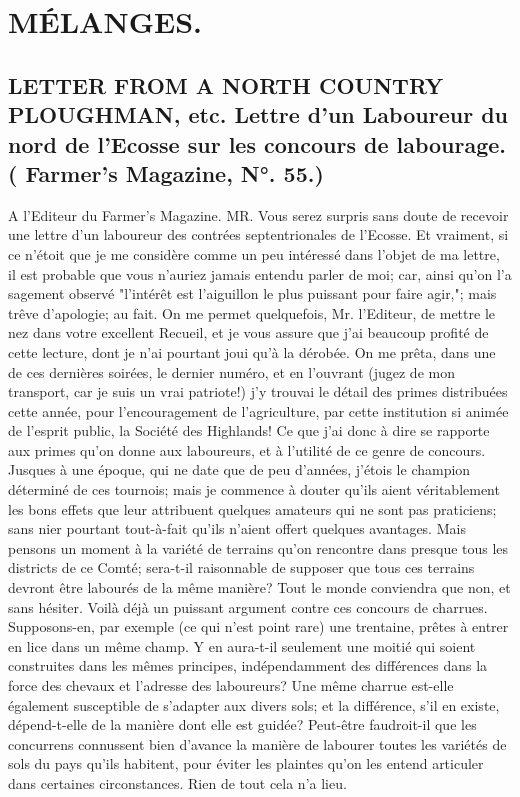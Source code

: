 \setcounter{page}{140}
\chapter{MÉLANGES.}
\section{LETTER FROM A NORTH COUNTRY PLOUGHMAN, etc. Lettre d'un Laboureur du nord de l'Ecosse sur les concours de labourage. ( Farmer's Magazine, N°. 55.)}
A l'Editeur du Farmer's Magazine.
MR.
Vous serez surpris sans doute de recevoir une lettre d'un laboureur des contrées septentrionales de l'Ecosse. Et vraiment, si ce n'étoit que je me considère comme un peu intéressé dans l'objet de ma lettre, il est probable que vous n'auriez jamais entendu parler de moi; car, ainsi qu'on l'a sagement observé "l'intérêt est l'aiguillon le plus puissant pour faire agir,"; mais trêve d'apologie; au fait.
On me permet quelquefois, Mr. l'Editeur, de mettre le nez dans votre excellent Recueil, et je vous assure que j'ai beaucoup profité de cette lecture, dont je n'ai pourtant joui qu'à la dérobée. On me prêta, dans une de ces dernières soirées, le dernier numéro, et en l'ouvrant (jugez de mon transport, car je suis un vrai patriote!) j'y trouvai\setcounter{page}{141} le détail des primes distribuées cette année, pour l'encouragement de l'agriculture, par cette institution si animée de l'esprit public, la Société des Highlands! Ce que j'ai donc à dire se rapporte aux primes qu'on donne aux laboureurs, et à l'utilité de ce genre de concours.
Jusques à une époque, qui ne date que de peu d'années, j'étois le champion déterminé de ces tournois; mais je commence à douter qu'ils aient véritablement les bons effets que leur attribuent quelques amateurs qui ne sont pas praticiens; sans nier pourtant tout-à-fait qu'ils n'aient offert quelques avantages. Mais pensons un moment à la variété de terrains qu'on rencontre dans presque tous les districts de ce Comté; sera-t-il raisonnable de supposer que tous ces terrains devront être labourés de la même manière? Tout le monde conviendra que non, et sans hésiter.
Voilà déjà un puissant argument contre ces concours de charrues. Supposons-en, par exemple (ce qui n'est point rare) une trentaine, prêtes à entrer en lice dans un même champ. Y en aura-t-il seulement une moitié qui soient construites dans les mêmes principes, indépendamment des différences dans la force des chevaux et l'adresse des laboureurs? Une même charrue est-elle également\setcounter{page}{142} susceptible de s'adapter aux divers sols; et la différence, s'il en existe, dépend-t-elle de la manière dont elle est guidée? Peut-être faudroit-il que les concurrens connussent bien d'avance la manière de labourer toutes les variétés de sols du pays qu'ils habitent, pour éviter les plaintes qu'on les entend articuler dans certaines circonstances. Rien de tout cela n'a lieu.
